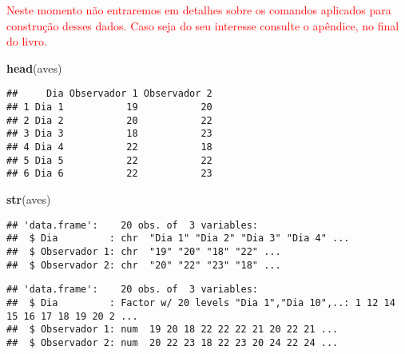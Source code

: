 \documentclass[]{book}
\newenvironment{Shaded}{\begin{snugshade}}{\end{snugshade}}
\newcommand{\DataTypeTok}[1]{\textcolor[rgb]{0.13,0.29,0.53}{#1}}
\newcommand{\KeywordTok}[1]{\textcolor[rgb]{0.13,0.29,0.53}{\textbf{#1}}}
\newcommand{\NormalTok}[1]{#1}
\newcommand{\OperatorTok}[1]{\textcolor[rgb]{0.81,0.36,0.00}{\textbf{#1}}}
\newcommand{\StringTok}[1]{\textcolor[rgb]{0.31,0.60,0.02}{#1}}
\begin{document}
\textcolor{red}{Neste momento não entraremos em detalhes sobre os comandos aplicados para construção desses dados. Caso seja do seu interesse consulte o apêndice, no final do livro.}

\begin{Shaded}
\begin{Highlighting}[]
\KeywordTok{head}\NormalTok{(aves)}
\end{Highlighting}
\end{Shaded}

\begin{verbatim}
##     Dia Observador 1 Observador 2
## 1 Dia 1           19           20
## 2 Dia 2           20           22
## 3 Dia 3           18           23
## 4 Dia 4           22           18
## 5 Dia 5           22           22
## 6 Dia 6           22           23
\end{verbatim}

\begin{Shaded}
\begin{Highlighting}[]
\KeywordTok{str}\NormalTok{(aves)}
\end{Highlighting}
\end{Shaded}

\begin{verbatim}
## 'data.frame':    20 obs. of  3 variables:
##  $ Dia         : chr  "Dia 1" "Dia 2" "Dia 3" "Dia 4" ...
##  $ Observador 1: chr  "19" "20" "18" "22" ...
##  $ Observador 2: chr  "20" "22" "23" "18" ...
\end{verbatim}

\begin{Shaded}
\end{Shaded}

\begin{verbatim}
## 'data.frame':    20 obs. of  3 variables:
##  $ Dia         : Factor w/ 20 levels "Dia 1","Dia 10",..: 1 12 14 15 16 17 18 19 20 2 ...
##  $ Observador 1: num  19 20 18 22 22 22 21 20 22 21 ...
##  $ Observador 2: num  20 22 23 18 22 23 20 24 22 24 ...
\end{verbatim}
\end{document}
